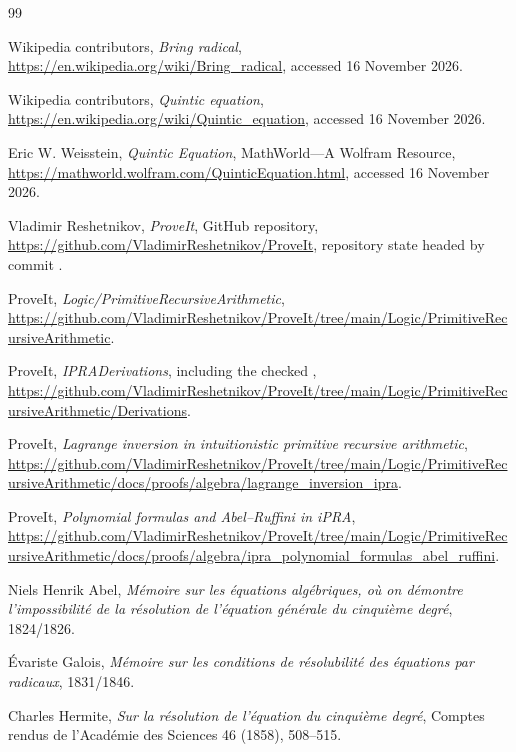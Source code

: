 \clearpage
\begin{thebibliography}{99}

Wikipedia contributors,
\emph{Bring radical},
\url{https://en.wikipedia.org/wiki/Bring_radical},
accessed 16 November 2026.

Wikipedia contributors,
\emph{Quintic equation},
\url{https://en.wikipedia.org/wiki/Quintic_equation},
accessed 16 November 2026.

Eric W. Weisstein,
\emph{Quintic Equation}, MathWorld---A Wolfram Resource,
\url{https://mathworld.wolfram.com/QuinticEquation.html},
accessed 16 November 2026.

Vladimir Reshetnikov,
\emph{ProveIt}, GitHub repository,
\url{https://github.com/VladimirReshetnikov/ProveIt},
repository state headed by commit
.

ProveIt,
\emph{Logic/PrimitiveRecursiveArithmetic},
\url{https://github.com/VladimirReshetnikov/ProveIt/tree/main/Logic/PrimitiveRecursiveArithmetic}.

ProveIt,
\emph{IPRADerivations}, including the checked
,
\url{https://github.com/VladimirReshetnikov/ProveIt/tree/main/Logic/PrimitiveRecursiveArithmetic/Derivations}.

ProveIt,
\emph{Lagrange inversion in intuitionistic primitive recursive arithmetic},
\url{https://github.com/VladimirReshetnikov/ProveIt/tree/main/Logic/PrimitiveRecursiveArithmetic/docs/proofs/algebra/lagrange_inversion_ipra}.

ProveIt,
\emph{Polynomial formulas and Abel--Ruffini in iPRA},
\url{https://github.com/VladimirReshetnikov/ProveIt/tree/main/Logic/PrimitiveRecursiveArithmetic/docs/proofs/algebra/ipra_polynomial_formulas_abel_ruffini}.

Niels Henrik Abel,
\emph{Mémoire sur les équations algébriques, où on démontre l'impossibilité de la résolution de l'équation générale du cinquième degré},
1824/1826.

Évariste Galois,
\emph{Mémoire sur les conditions de résolubilité des équations par radicaux},
1831/1846.

Charles Hermite,
\emph{Sur la résolution de l'équation du cinquième degré},
Comptes rendus de l'Académie des Sciences 46 (1858), 508--515.


\end{thebibliography}
